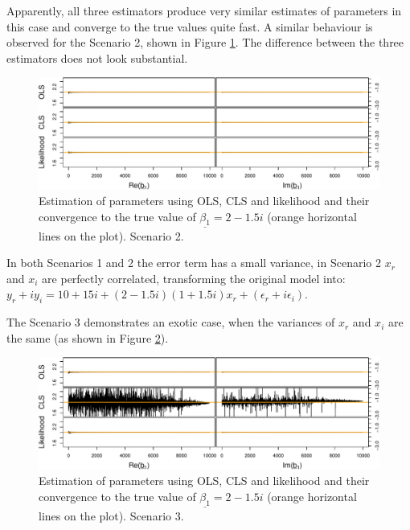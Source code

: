 \documentclass[
]{book}
\begin{document}
Apparently, all three estimators produce very similar estimates of parameters in this case and converge to the true values quite fast. A similar behaviour is observed for the Scenario 2, shown in Figure \ref{fig:parametersPC}. The difference between the three estimators does not look substantial.

\begin{figure}
\centering
\includegraphics{Svetunkov---Svetunkov---Complex-Valued-Econometrics_files/figure-latex/parametersPC-1.pdf}
\caption{\label{fig:parametersPC}Estimation of parameters using OLS, CLS and likelihood and their convergence to the true value of \(\underline{\beta_1}=2-1.5i\) (orange horizontal lines on the plot). Scenario 2.}
\end{figure}

In both Scenarios 1 and 2 the error term has a small variance, in Scenario 2 \(x_r\) and \(x_i\) are perfectly correlated, transforming the original model into: \(y_r + i y_i = 10+15i + (2-1.5i) (1 + 1.5 i) x_r + (\epsilon_r + i \epsilon_i)\).

The Scenario 3 demonstrates an exotic case, when the variances of \(x_r\) and \(x_i\) are the same (as shown in Figure \ref{fig:parametersUCSV}).

\begin{figure}
\centering
\includegraphics{Svetunkov---Svetunkov---Complex-Valued-Econometrics_files/figure-latex/parametersUCSV-1.pdf}
\caption{\label{fig:parametersUCSV}Estimation of parameters using OLS, CLS and likelihood and their convergence to the true value of \(\underline{\beta_1}=2-1.5i\) (orange horizontal lines on the plot). Scenario 3.}
\end{figure}
\end{document}
